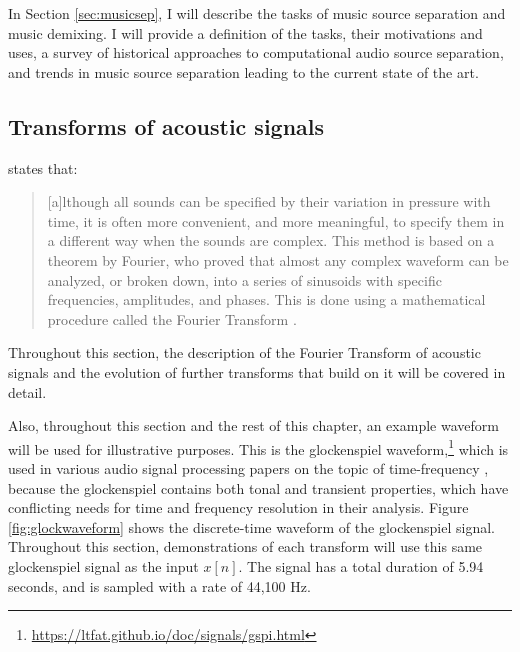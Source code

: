 \documentclass[report.tex]{subfiles}
\begin{document}
In Section \ref{sec:musicsep}, I will describe the tasks of music source separation and music demixing. I will provide a definition of the tasks, their motivations and uses, a survey of historical approaches to computational audio source separation, and trends in music source separation leading to the current state of the art.

\subsection{Transforms of acoustic signals}
\label{sec:freqdomain}

\citeauthor{moore} states that:

\begin{quote}
	[a]lthough all sounds can be specified by their variation in pressure with time, it is often more convenient, and more meaningful, to specify them in a different way when the sounds are complex. This method is based on a theorem by Fourier, who proved that almost any complex waveform can be analyzed, or broken down, into a series of sinusoids with specific frequencies, amplitudes, and phases. This is done using a mathematical procedure called the Fourier Transform \parencite[4]{moore}.
\end{quote}

Throughout this section, the description of the Fourier Transform of acoustic signals and the evolution of further transforms that build on it will be covered in detail.

Also, throughout this section and the rest of this chapter, an example waveform will be used for illustrative purposes. This is the glockenspiel waveform,\footnote{\url{https://ltfat.github.io/doc/signals/gspi.html}} which is used in various audio signal processing papers on the topic of time-frequency \parencite{doerflerphd, balazs, jaillet, tfjigsaw, invertiblecqt, wmdct}, because the glockenspiel contains both tonal and transient properties, which have conflicting needs for time and frequency resolution in their analysis. Figure \ref{fig:glockwaveform} shows the discrete-time waveform of the glockenspiel signal. Throughout this section, demonstrations of each transform will use this same glockenspiel signal as the input $x[n]$. The signal has a total duration of 5.94 seconds, and is sampled with a rate of 44,100 Hz.
\end{document}
